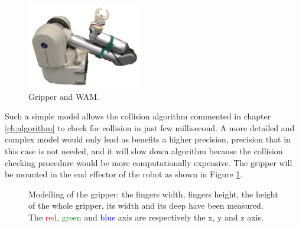 \begin{figure}
\caption{Gripper and WAM.}\label{fig:wam_gripper}
\includegraphics[width=5.0cm]{Img/set_up/wam_gripper2.png}
\end{figure}

Such a simple model allows the collision algorithm commented in chapter \ref{ch:algorithm} to check for collision in just few millisecond. 
A more detailed and complex model would only lead as benefits a higher precision, precision that in this case is not needed, and it will slow down algorithm because the collision checking procedure would be more computationally expensive. 
The gripper will be mounted in the end effector of the robot as shown in Figure \ref{fig:wam_gripper}. 


\begin{figure}[htp]
\centering
\begin{subfigure}[t]{0.25\textwidth}
\centering
{}
\end{subfigure} 
\begin{subfigure}[t]{0.3\textwidth}
\centering
{}
\end{subfigure}
\hspace{1cm}
\begin{subfigure}[t]{0.3\textwidth}
\centering
{}
\end{subfigure}
\caption{Modelling of the gripper: the fingers width, fingers height, the height of the whole gripper, its width and its deep have been measured. The \textcolor{red}{red}, \textcolor{green}{green} and \textcolor{blue}{blue} axis are respectively the x, y and z axis.}\label{fig:gripper_modelling}
\end{figure}

